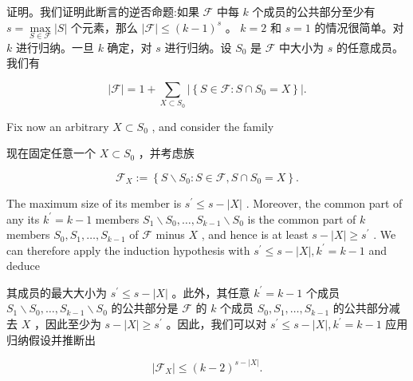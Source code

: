 \documentclass[10pt]{article}
\begin{document}
\begin{tcolorbox}\relax
证明。我们证明此断言的逆否命题:如果 \(\mathcal{F}\) 中每 \(k\) 个成员的公共部分至少有 \(s = \mathop{\max }\limits_{{S \in  \mathcal{F}}}\left| S\right|\) 个元素，那么 \(\left| \mathcal{F}\right|  \leq  {\left( k - 1\right) }^{s}\) 。 \(k = 2\) 和 \(s = 1\) 的情况很简单。对 \(k\) 进行归纳。一旦 \(k\) 确定，对 \(s\) 进行归纳。设 \({S}_{0}\) 是 \(\mathcal{F}\) 中大小为 \(s\) 的任意成员。我们有
\end{tcolorbox}

\[
\left| \mathcal{F}\right|  = 1 + \mathop{\sum }\limits_{{X \subset  {S}_{0}}}\left| \left\{  {S \in  \mathcal{F} : S \cap  {S}_{0} = X}\right\}  \right| . \tag{6.2}
\]

Fix now an arbitrary \(X \subset  {S}_{0}\) , and consider the family

\begin{tcolorbox}\relax
现在固定任意一个 \(X \subset  {S}_{0}\) ，并考虑族
\end{tcolorbox}

\[
{\mathcal{F}}_{X} \mathrel{\text{ := }} \left\{  {S \smallsetminus  {S}_{0} : S \in  \mathcal{F},S \cap  {S}_{0} = X}\right\}  .
\]

The maximum size of its member is \({s}^{\prime } \leq  s - \left| X\right|\) . Moreover, the common part of any its \({k}^{\prime } = k - 1\) members \({S}_{1} \smallsetminus  {S}_{0},\ldots ,{S}_{k - 1} \smallsetminus  {S}_{0}\) is the common part of \(k\) members \({S}_{0},{S}_{1},\ldots ,{S}_{k - 1}\) of \(\mathcal{F}\) minus \(X\) , and hence is at least \(s - \left| X\right|  \geq  {s}^{\prime }\) . We can therefore apply the induction hypothesis with \({s}^{\prime } \leq  s - \left| X\right| ,{k}^{\prime } = k - 1\) and deduce

\begin{tcolorbox}\relax
其成员的最大大小为 \({s}^{\prime } \leq  s - \left| X\right|\) 。此外，其任意 \({k}^{\prime } = k - 1\) 个成员 \({S}_{1} \smallsetminus  {S}_{0},\ldots ,{S}_{k - 1} \smallsetminus  {S}_{0}\) 的公共部分是 \(\mathcal{F}\) 的 \(k\) 个成员 \({S}_{0},{S}_{1},\ldots ,{S}_{k - 1}\) 的公共部分减去 \(X\) ，因此至少为 \(s - \left| X\right|  \geq  {s}^{\prime }\) 。因此，我们可以对 \({s}^{\prime } \leq  s - \left| X\right| ,{k}^{\prime } = k - 1\) 应用归纳假设并推断出
\end{tcolorbox}

\[
\left| {\mathcal{F}}_{X}\right|  \leq  {\left( k - 2\right) }^{s - \left| X\right| }. \tag{6.3}
\]
\end{document}
